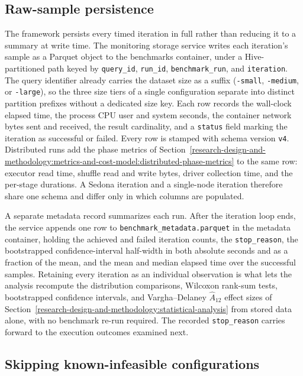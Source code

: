 \subsection{Raw-sample persistence}
\label{system-architecture-and-implementation:measurement-instrumentation-and-cost-model:raw-sample-persistence}

The framework persists every timed iteration in full rather than reducing it to a summary at write time. The monitoring storage service writes each iteration's sample as a Parquet object to the benchmarks container, under a Hive-partitioned path keyed by \texttt{query\_id}, \texttt{run\_id}, \texttt{benchmark\_run}, and \texttt{iteration}. The query identifier already carries the dataset size as a suffix (\texttt{-small}, \texttt{-medium}, or \texttt{-large}), so the three size tiers of a single configuration separate into distinct partition prefixes without a dedicated size key. Each row records the wall-clock elapsed time, the process CPU user and system seconds, the container network bytes sent and received, the result cardinality, and a \texttt{status} field marking the iteration as successful or failed. Every row is stamped with schema version \texttt{v4}. Distributed runs add the phase metrics of Section~\ref{research-design-and-methodology:metrics-and-cost-model:distributed-phase-metrics} to the same row: executor read time, shuffle read and write bytes, driver collection time, and the per-stage durations. A Sedona iteration and a single-node iteration therefore share one schema and differ only in which columns are populated.

A separate metadata record summarizes each run. After the iteration loop ends, the service appends one row to \texttt{benchmark\_metadata.parquet} in the metadata container, holding the achieved and failed iteration counts, the \texttt{stop\_reason}, the bootstrapped confidence-interval half-width in both absolute seconds and as a fraction of the mean, and the mean and median elapsed time over the successful samples. Retaining every iteration as an individual observation is what lets the analysis recompute the distribution comparisons, Wilcoxon rank-sum tests, bootstrapped confidence intervals, and Vargha--Delaney $\hat{A}_{12}$ effect sizes of Section~\ref{research-design-and-methodology:statistical-analysis} from stored data alone, with no benchmark re-run required. The recorded \texttt{stop\_reason} carries forward to the execution outcomes examined next.

\subsection{Skipping known-infeasible configurations}
\label{system-architecture-and-implementation:measurement-instrumentation-and-cost-model:execution-outcomes-and-skipped-cells}

